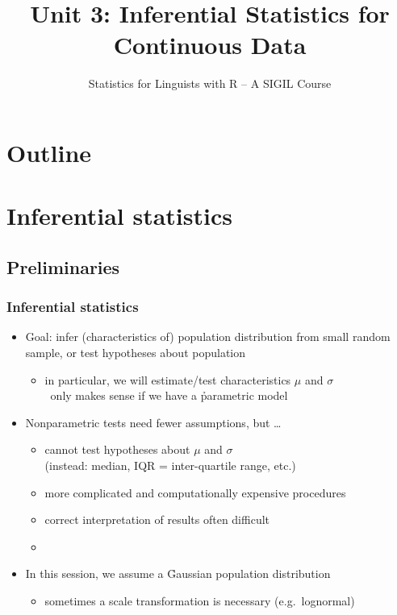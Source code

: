 \documentclass[t,notes=show]{beamer} %
\title[3b.\ Continuous Data: Inference]{Unit 3: Inferential Statistics for Continuous Data}
\subtitle{Statistics for Linguists with R -- A SIGIL Course}
\date[sigil.r-forge.r-project.org]{%
  \light{\tiny \sigilcopyright}}
\begin{document}
\frame{\titlepage}


\section*{Outline}

\section{Inferential statistics}

\subsection{Preliminaries}

\begin{frame}
  \frametitle{Inferential statistics}

  \begin{itemize}
  \item Goal: infer (characteristics of) population distribution from small
    random sample, or test hypotheses about population
    \begin{itemize}
    \item in particular, we will estimate/test characteristics $\mu$ and $\sigma$\\
      \hand\ only makes sense if we have a \h{parametric} model
    \end{itemize}
  \item Nonparametric tests need fewer assumptions, but \ldots
    \begin{itemize}
    \item cannot test hypotheses about $\mu$ and $\sigma$\\
      (instead: median, IQR = inter-quartile range, etc.)
    \item more complicated and computationally expensive procedures
    \item correct interpretation of results often difficult
    \item[]
    \end{itemize}
  \item In this session, we assume a \h{Gaussian population} distribution%
    \begin{itemize}
    \item sometimes a scale transformation is necessary (e.g.\ lognormal)
    \end{itemize}
  \end{itemize}
\end{frame}
\end{document}
